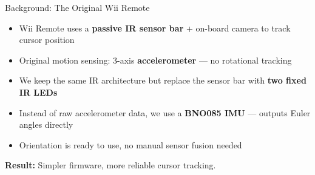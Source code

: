 \documentclass[aspectratio=169]{beamer}
\begin{document}
\begin{frame}{Background: The Original Wii Remote}
  \vspace{0pt plus 0.3filll}
  \begin{itemize}\setlength\itemsep{0.55em}
    \item Wii Remote uses a \textbf{passive IR sensor bar} + on-board camera to track cursor position
    \item Original motion sensing: 3-axis \textbf{accelerometer} --- no rotational tracking
  \end{itemize}
  \vspace{0pt plus 0.8filll}
  \begin{itemize}\setlength\itemsep{0.55em}
    \item We keep the same IR architecture but replace the sensor bar with \textbf{two fixed IR LEDs}
    \item Instead of raw accelerometer data, we use a \textbf{BNO085 IMU} --- outputs Euler angles directly
    \item Orientation is ready to use, no manual sensor fusion needed
  \end{itemize}
  \vspace{0pt plus 1filll}
  \begin{center}
    \large\textbf{Result:} Simpler firmware, more reliable cursor tracking.
  \end{center}
  \vspace{0pt plus 1filll}
\end{frame}

\end{document}
